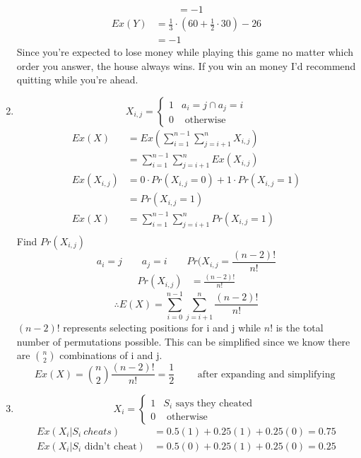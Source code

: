 \documentclass{article}
\begin{document}
\begin{enumerate}
\begin{align*}
				&= -1
			\end{align*}
			\begin{align*}
				Ex(Y) &= \frac{1}{3} \cdot (60 + \frac{1}{2} \cdot 30) - 26 \\
				&= -1
			\end{align*}
			Since you're expected to lose money while playing this game no matter which order you answer, the house always wins. If you win an money I'd recommend quitting while you're ahead.
		\item %
		\[ X_{i, j} = \begin{cases} 
			1 & a_i = j \cap a_j = i \\          0 & \text{ otherwise } 
		\end{cases} \]
		\begin{align*}
			Ex(X) &= Ex(\sum_{i = 1}^{n - 1} \sum_{j = i + 1}^{n} X_{i, j})  \\ &= \sum_{i = 1}^{n - 1} \sum_{j = i + 1}^{n} Ex(X_{i, j}) \\
			Ex(X_{i, j}) &= 0 \cdot Pr(X_{i,j} = 0) + 1 \cdot Pr(X_{i,j} = 1) \\
			&= Pr(X_{i,j} = 1) \\
			Ex(X) &= \sum_{i = 1}^{n - 1}\sum_{j = i + 1}^{n} Pr(X_{i, j} = 1) \\
		\end{align*}
		Find $Pr(X_{i, j})$
		\[ a_i = j \qquad a_j = i \qquad Pr(X_{i, j} = \frac{(n - 2)!}{n!}\]
		\begin{align*}
			Pr(X_{i, j}) &= \frac{(n - 2)!}{n!}
		\end{align*}
		\[\therefore E(X) = \sum_{i = 0}^{n - 1} \sum_{j = i + 1}^{n}\frac{(n - 2)!}{n!}\]
		$(n - 2)!$ represents selecting positions for i and j while $n!$ is the total number of permutations possible.
		This can be simplified since we know there are $\binom{n}{2}$ combinations of i and j.
		\[
			Ex(X) = \binom{n}{2} \frac{(n - 2)!}{n!} = \frac{1}{2} \qquad \text{ after expanding and simplifying }
		\]
		\item %
			\[ X_i = \begin{cases} 
			1 & S_i \text{ says they cheated } \\          0 & \text{ otherwise } 
		\end{cases} \]
		\begin{align*}
			Ex(X_i | S_i\ cheats) & = 0.5(1) + 0.25(1) + 0.25(0) = 0.75 \\
			Ex(X_i | S_i \text{ didn't cheat}) &= 0.5(0) + 0.25(1) + 0.25(0) = 0.25
		\end{align*}

\end{enumerate}
\end{document}
